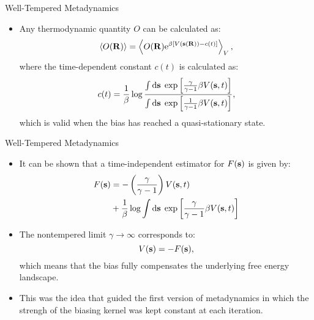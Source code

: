 \documentclass[10pt]{beamer}
\begin{document}
\begin{frame}{Well-Tempered Metadynamics}
\begin{itemize}
\setlength\itemsep{1em}
  \item Any thermodynamic quantity $O$ can be calculated as:
  \begin{equation}
    \left< O({\bf R}) \right> = \left< O({\bf R}) \mathrm{e}^{\beta [V({\bf s}({\bf R}))-c(t)]} \right>_V,
  \end{equation}
  where the time-dependent constant $c(t)$ is calculated as:
  \begin{equation}
    c(t) = \frac{1}{\beta}\log\frac{\int\mathrm{d}{\bf s}\;\exp\left[ \frac{\gamma}{\gamma-1}\beta V({\bf s},t) \right]}{\int\mathrm{d}{\bf s}\;\exp\left[ \frac{1}{\gamma-1}\beta V({\bf s},t) \right]},
  \end{equation}
  which is valid when the bias has reached a quasi-stationary state.
\end{itemize}
\end{frame}

\begin{frame}{Well-Tempered Metadynamics}
\begin{itemize}
\setlength\itemsep{1em}
  \item It can be shown that a time-independent estimator for $F({\bf s})$ is given by:
  \begin{align}
    F({\bf s}) &= -\left( \frac{\gamma}{\gamma-1} \right)V({\bf s}, t) \nonumber\\
           &+ \frac{1}{\beta}\log\int\mathrm{d}{\bf s}\; \exp\left[ \frac{\gamma}{\gamma-1} \beta V({\bf s},t) \right]
  \end{align}

  \item The nontempered limit $\gamma\to\infty$ corresponds to:
  \begin{equation}
    V({\bf s}) = -F({\bf s}),
  \end{equation}
  which means that the bias fully compensates the underlying free energy landscape.

  \item This was the idea that guided the first version of metadynamics in which the strengh of the biasing kernel was kept constant at each iteration.
\end{itemize}
\end{frame}
\end{document}
